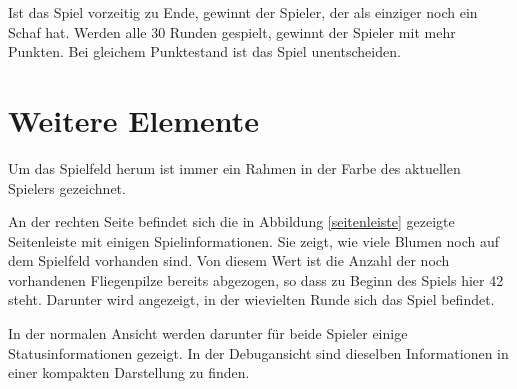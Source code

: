 \documentclass[11pt,pointlessnumbers,DIV10,BCOR10mm,tocleft]{scrreprt}
\begin{document}
Ist das Spiel vorzeitig zu Ende, gewinnt der Spieler, der als einziger noch ein Schaf hat. Werden alle 30 Runden gespielt, gewinnt der Spieler mit mehr Punkten. Bei gleichem Punktestand ist das Spiel unentscheiden.

\section{Weitere Elemente}
Um das Spielfeld herum ist immer ein Rahmen in der Farbe des aktuellen Spielers gezeichnet.

An der rechten Seite befindet sich die in Abbildung \ref{seitenleiste} gezeigte Seitenleiste mit einigen Spielinformationen. Sie zeigt, wie viele Blumen noch auf dem Spielfeld vorhanden sind. Von diesem Wert ist die Anzahl der noch vorhandenen Fliegenpilze bereits abgezogen, so dass zu Beginn des Spiels hier 42 steht. Darunter wird angezeigt, in der wievielten Runde sich das Spiel befindet.

In der normalen Ansicht werden darunter für beide Spieler einige Statusinformationen gezeigt. In der Debugansicht sind dieselben Informationen in einer kompakten Darstellung zu finden. 
\end{document}
